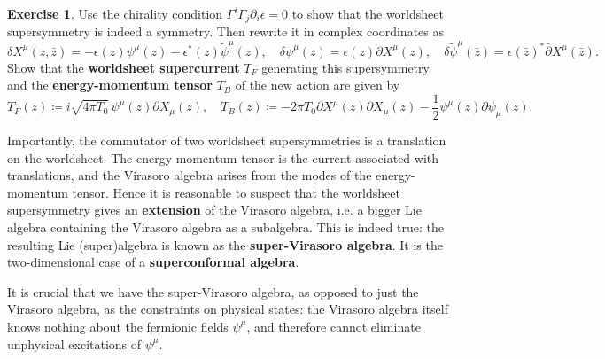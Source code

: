 \documentclass{report}
\theoremstyle{plain}
\theoremstyle{definition}
\newtheorem{exercise}{Exercise}[section]
\theoremstyle{remark}
\newcommand{\di}{\partial}
\newcommand{\bz}{\bar{z}}
\newcommand{\bdi}{\bar{\di}}
\begin{document}
\begin{exercise}
  Use the chirality condition $\Gamma^i \Gamma_j \di_i \epsilon = 0$
  to show that the worldsheet supersymmetry is indeed a symmetry. Then
  rewrite it in complex coordinates as
  \[ \delta X^\mu(z, \bz) = -\epsilon(z) \psi^\mu(z) - \epsilon^*(z) \tilde{\psi}^\mu(z), \quad \delta \psi^\mu(z) = \epsilon(z) \di X^\mu(z), \quad \delta \tilde{\psi}^\mu(\bz) = \epsilon(\bz)^* \bdi X^\mu(\bz). \]
  Show that the {\bf worldsheet supercurrent} $T_F$ generating this
  supersymmetry and the {\bf energy-momentum tensor} $T_B$
  of the new action are given by
  \[ T_F(z) \coloneqq i\sqrt{4\pi T_0} \, \psi^\mu(z) \di X_\mu(z), \quad T_B(z) \coloneqq -2\pi T_0 \di X^\mu(z) \di X_\mu(z) - \frac{1}{2} \psi^\mu(z) \di \psi_\mu(z). \]
\end{exercise}

Importantly, the commutator of two worldsheet supersymmetries is a
translation on the worldsheet. The energy-momentum tensor is the
current associated with translations, and the Virasoro algebra arises
from the modes of the energy-momentum tensor. Hence it is reasonable
to suspect that the worldsheet supersymmetry gives an {\bf extension}
of the Virasoro algebra, i.e. a bigger Lie algebra containing the
Virasoro algebra as a subalgebra. This is indeed true: the resulting
Lie (super)algebra is known as the {\bf super-Virasoro algebra}. It is
the two-dimensional case of a {\bf superconformal algebra}.

It is crucial that we have the super-Virasoro algebra, as opposed to
just the Virasoro algebra, as the constraints on physical states: the
Virasoro algebra itself knows nothing about the fermionic fields
$\psi^\mu$, and therefore cannot eliminate unphysical excitations of
$\psi^\mu$.
\end{document}
